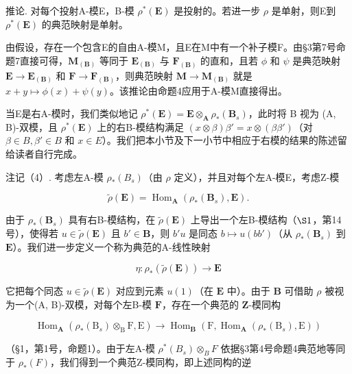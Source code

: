 推论. 对每个投射A-模E，B-模 \(\rho^{*}(\mathbf{E})\) 是投射的。若进一步 \(\rho\) 是单射，则E到 \(\rho^{*}(\mathbf{E})\) 的典范映射是单射。

由假设，存在一个包含E的自由A-模M，且E在M中有一个补子模F。由§3第7号命题7直接可得，\(\mathbf{M}_{(\mathbf{B})}\) 等同于 \(\mathbf{E}_{(\mathbf{B})}\) 与 \(\mathbf{F}_{(\mathbf{B})}\) 的直和，且若 \(\phi\) 和 \(\psi\) 是典范映射 \(\mathbf{E} \to \mathbf{E}_{(\mathbf{B})}\) 和 \(\mathbf{F} \to \mathbf{F}_{(\mathbf{B})}\)，则典范映射 \(\mathbf{M} \to \mathbf{M}_{(\mathbf{B})}\) 就是 \(x + y \mapsto \phi(x) + \psi(y)\)。该推论由命题4应用于A-模M直接得出。

当E是右A-模时，我们类似地记 \(\rho^{*}(\mathbf{E}) = \mathbf{E} \otimes_{\mathbf{A}} \rho_{*}(\mathbf{B}_{s})\)，此时将 B 视为 (A, B)-双模，且 \(\rho^{*}(\mathbf{E})\) 上的右B-模结构满足 \((x \otimes \beta)\beta' = x \otimes (\beta\beta')\)（对 \(\beta \in B, \beta' \in B\) 和 \(x \in E\)）。我们把本小节及下一小节中相应于右模的结果的陈述留给读者自行完成。

注记（4）. 考虑左A-模 \(\rho_{*}(B_{s})\)（由 \(\rho\) 定义），并且对每个左A-模E，考虑Z-模

\[
\tilde {\rho} (\mathbf {E}) = \operatorname{Hom} _ {\mathbf {A}} \left(\rho_ {*} \left(\mathbf {B} _ {s}\right), \mathbf {E}\right).\tag{6}
\]

由于 \(\rho_{*}(\mathbf{B}_{s})\) 具有右B-模结构，在 \(\tilde{\rho}(\mathbf{E})\) 上导出一个左B-模结构（\(\S 1\)，第14号），使得若 \(u \in \tilde{\rho}(\mathbf{E})\) 且 \(b' \in \mathbf{B}\)，则 \(b'u\) 是同态 \(b \mapsto u(bb')\)（从 \(\rho_{*}(\mathbf{B}_{s})\) 到 \(\mathbf{E}\)）。我们进一步定义一个称为典范的A-线性映射

\[
\eta : \rho_ {*} (\tilde {\rho} (\mathbf {E})) \rightarrow \mathbf {E}\tag{7}
\]

它把每个同态 \(u \in \tilde{\rho}(\mathbf{E})\) 对应到元素 \(u(1)\)（在 \(\mathbf{E}\) 中）。由于 \(\mathbf{B}\) 可借助 \(\rho\) 被视为一个(A, B)-双模，对每个左B-模 \(\mathbf{F}\)，存在一个典范的 \(\mathbf{Z}\)-模同构

\[
\operatorname{Hom} _ {\mathbf {A}} \left(\rho_ {*} (\mathrm{B} _ {s}) \otimes_ {\mathrm{B}} \mathrm{F}, \mathrm{E}\right)\rightarrow \operatorname{Hom} _ {\mathbf {B}} (\mathrm{F}, \operatorname{Hom} _ {\mathbf {A}} \left(\rho_ {*} (\mathrm{B} _ {s}), \mathrm{E}\right))
\]

（§1，第1号，命题1）。由于左A-模 \(\rho^{*}(B_{s}) \otimes_{B} F\) 依据§3第4号命题4典范地等同于 \(\rho_{*}(F)\)，我们得到一个典范Z-模同构，即上述同构的逆

